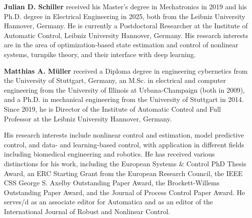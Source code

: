 \documentclass[a4paper,fleqn]{cas-dc}
\begin{document}


\textbf{Julian D. Schiller} received his Master's degree in Mechatronics in 2019 and his Ph.D. degree in Electrical Engineering in 2025, both from the Leibniz University Hannover, Germany. He is currently a Postdoctoral Researcher at the Institute of Automatic Control, Leibniz University Hannover, Germany. His research interests are in the area of optimization-based state estimation and control of nonlinear systems, turnpike theory, and their interface with deep learning.
\endbio

\textbf{Matthias A. Müller} received a Diploma degree in engineering cybernetics from the University of Stuttgart, Germany, an M.Sc. in electrical and computer engineering from the University of Illinois at Urbana-Champaign (both in 2009), and a Ph.D. in mechanical engineering from the University of Stuttgart in 2014. Since 2019, he is Director of the Institute of Automatic Control and Full Professor at the Leibniz University Hannover, Germany.

His research interests include nonlinear control and estimation, model predictive control, and data- and learning-based control, with application in different fields including biomedical engineering and robotics. He has received various distinctions for his work, including the European Systems \& Control PhD Thesis Award, an ERC Starting Grant from the European Research Council, the IEEE CSS George S. Axelby Outstanding Paper Award, the Brockett-Willems Outstanding Paper Award, and the Journal of Process Control Paper Award. He serves/d as an associate editor for Automatica and as an editor of the International Journal of Robust and Nonlinear Control.
\endbio
\end{document}
